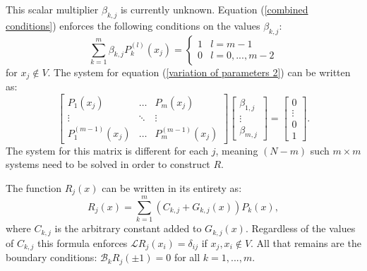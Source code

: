 \documentclass{book}
\begin{document}
This scalar multiplier $\beta_{k,j}$ is currently unknown.
Equation (\ref{combined conditions}) enforces the following conditions on the values $\beta_{k,j}$:
\begin{equation} \label{variation of parameters 2}
\sum_{k=1}^m \beta_{k,j} P_k^{(l)}(x_j) = \begin{cases} 1 & l = m-1 \\ 0 & l =0,...,m-2 \end{cases}
\end{equation}
for $x_j \notin V$.
The system for equation (\ref{variation of parameters 2}) can be written as:
\begin{equation} \label{eq:betas}
\begin{bmatrix} P_1(x_j) & \dots & P_m(x_j)
\\ \vdots & \ddots & \vdots
\\ P_1^{(m-1)}(x_j) & \dots & P_m^{(m-1)}(x_j) \end{bmatrix}
\begin{bmatrix} \beta_{1,j} \\ \vdots \\ \beta_{m,j} \end{bmatrix} =
\begin{bmatrix} 0 \\ \vdots \\ 0 \\ 1 \end{bmatrix} .
\end{equation}
The system for this matrix is different for each $j$, meaning $(N - m)$ such $m \times m$ systems need to be solved in order to construct $R$.

The function $R_j(x)$ can be written in its entirety as:
\begin{equation}
R_j(x) = \sum_{k=1}^m (C_{k,j} + G_{k,j}(x) ) P_k(x) ,
\end{equation}
where $C_{k,j}$ is the arbitrary constant added to $G_{k,j}(x)$.
Regardless of the values of $C_{k,j}$ this formula enforces $\mathcal{L} R_j(x_i) = \delta_{ij}$ if $x_j, x_i \notin V$.
All that remains are the boundary conditions: $\mathcal{B}_k R_j( \pm 1) = 0$ for all $k = 1,...,m$.
\end{document}
